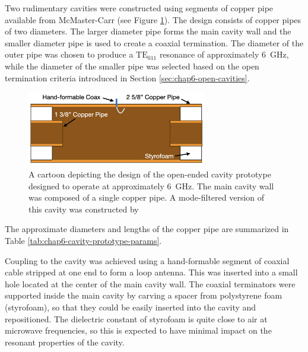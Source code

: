 Two rudimentary cavities were constructed using segments of copper pipe available from McMaster-Carr (see Figure \ref{fig:toy-cavity-cartoon}). The design consists of copper pipes of two diameters. The larger diameter pipe forms the main cavity wall and the smaller diameter pipe is used to create a coaxial termination. The diameter of the outer pipe was chosen to produce a $\mathrm{TE}_{011}$ resonance of approximately 6~GHz, while the diameter of the smaller pipe was selected based on the open termination criteria introduced in Section \ref{sec:chap6-open-cavities}.
\begin{figure}[htbp]
    \centering
    \includegraphics*[width=0.7\textwidth]{figs/Chapter-6/230612_toy_cavity_cartoon.png}
    \caption{\label{fig:toy-cavity-cartoon} A cartoon depicting the design of the open-ended cavity prototype designed to operate at approximately 6~GHz. The main cavity wall was composed of a single copper pipe. A mode-filtered version of this cavity was constructed by }
\end{figure}
The approximate diameters and lengths of the copper pipe are summarized in Table \ref{tab:chap6-cavity-prototype-params}. 

Coupling to the cavity was achieved using a hand-formable segment of coaxial cable stripped at one end to form a loop antenna. This was inserted into a small hole located at the center of the main cavity wall. The coaxial terminators were supported inside the main cavity by carving a spacer from polystyrene foam (styrofoam), so that they could be easily inserted into the cavity and repositioned. The dielectric constant of styrofoam is quite close to air at microwave frequencies, so this is expected to have minimal impact on the resonant properties of the cavity. 


